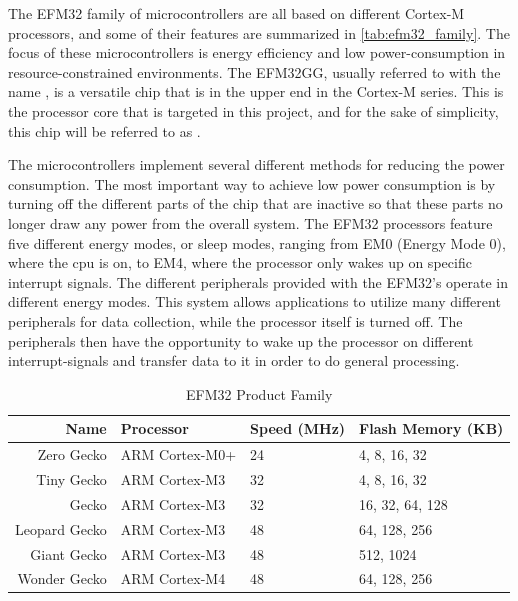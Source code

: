 The EFM32 family of microcontrollers are all based on different Cortex-M processors, and some of their features are summarized in \autoref{tab:efm32_family}.
The focus of these microcontrollers is energy efficiency and low power-consumption in resource-constrained environments.
The EFM32GG, usually referred to with the name , is a versatile chip that is in the upper end in the Cortex-M series.
This is the processor core that is targeted in this project, and for the sake of simplicity, this chip will be referred to as {\gecko}.

The microcontrollers implement several different methods for reducing the power consumption.
The most important way to achieve low power consumption is by turning off the different parts of the chip that are inactive so that these parts no longer draw any power from the overall system.
The EFM32 processors feature five different energy modes, or sleep modes, ranging from EM0 (Energy Mode 0), where the \gls{cpu} is on, to EM4, where the processor only wakes up on specific interrupt signals.
The different peripherals provided with the EFM32's operate in different energy modes.
This system allows applications to utilize many different peripherals for data collection, while the processor itself is turned off.
The peripherals then have the opportunity to wake up the processor on different interrupt-signals and transfer data to it in order to do general processing.

\begin{table}[b]
\begin{center}
    \begin{tabular}{r|l|l|l}
    \textbf{Name} & \textbf{Processor} & \textbf{Speed (MHz)} & \textbf{Flash Memory (KB)} \\
    \hline
    Zero Gecko    & ARM Cortex-M0+ & 24 & 4, 8, 16, 32    \\
    Tiny Gecko    & ARM Cortex-M3  & 32 & 4, 8, 16, 32    \\
    Gecko         & ARM Cortex-M3  & 32 & 16, 32, 64, 128 \\
    Leopard Gecko & ARM Cortex-M3  & 48 & 64, 128, 256    \\
    Giant Gecko   & ARM Cortex-M3  & 48 & 512, 1024       \\
    Wonder Gecko  & ARM Cortex-M4  & 48 & 64, 128, 256    \\
    \hline
    \end{tabular}
\end{center}
\caption{EFM32 Product Family \cite{Labs2014}}
\label{tab:efm32_family}
\end{table}

